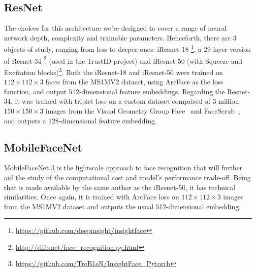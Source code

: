 \documentclass[class=report, crop=false, a4paper, 12pt]{standalone}
\begin{document}
\subsection{ResNet}
The choices for this architecture we're designed to cover a range of neural network depth, complexity and trainable parameters. Henceforth, there are 3 objects of study, ranging from less to deeper ones: iResnet-18 \footnote{\url{https://github.com/deepinsight/insightface}}, a 29 layer version of Resnet-34 \footnote{\url{http://dlib.net/face_recognition.py.html}} (used in the TrustID project) and iResnet-50 (with Squeeze and Excitation blocks)\footnote{\label{fnote6}\url{https://github.com/TreB1eN/InsightFace_Pytorch}}. Both the iResnet-18 and iResnet-50 were trained on $112\times112\times3$ faces from the MS1MV2 dataset, using ArcFace as the loss function, and output 512-dimensional feature embeddings. Regarding the Resnet-34, it was trained with triplet loss on a custom dataset comprised of 3 million $150\times150\times3$ images from the Visual Geometry Group
Face~\autocite{parkhiDeepFaceRecognition2015} and FaceScrub~\autocite{ngDatadrivenApproachCleaning2014}, and outputs a 128-dimensional feature embedding.

\subsection{MobileFaceNet}
MobileFaceNet \cref{fnote6} is the lightscale approach to face recognition that will further aid the study of the computational cost and model's performance trade-off. Being that is made available by the same author as the iResnet-50, it has technical similarities. Once again, it is trained with ArcFace loss on $112\times112\times3$ images from the MS1MV2 dataset and outputs the usual 512-dimensional embedding.
\end{document}
